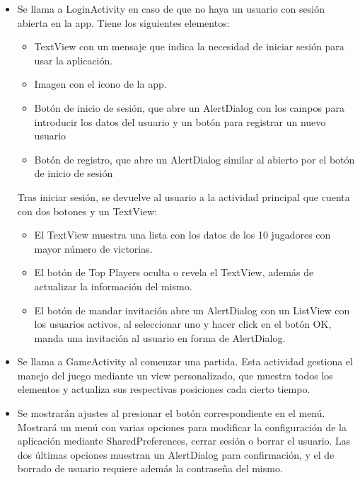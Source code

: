 \documentclass[a4paper,openright,12pt]{article}
\begin{document}
\begin{itemize}
    \item Se llama a LoginActivity en caso de que no haya un usuario con sesión abierta en la app. Tiene los siguientes elementos:
    \begin{itemize}
        \item TextView con un mensaje que indica la necesidad de iniciar sesión para usar la aplicación.
	\item Imagen con el icono de la app.
        \item Botón de inicio de sesión, que abre un AlertDialog con los campos para introducir los datos del usuario y un botón para registrar un nuevo usuario
        \item Botón de registro, que abre un AlertDialog similar al abierto por el botón de inicio de sesión
    \end{itemize}
    Tras iniciar sesión, se devuelve al usuario a la actividad principal que cuenta con dos botones y un TextView:
    \begin{itemize}
       \item El TextView muestra una lista con los datos de los 10 jugadores con mayor número de victorias. 
        
        \item El botón de Top Players oculta o revela el TextView, además de actualizar la información del mismo.
        
        \item El botón de mandar invitación abre un AlertDialog con un ListView con los usuarios activos, al seleccionar uno y hacer click en el botón OK, manda una invitación al usuario en forma de AlertDialog.
    \end{itemize}

    \item Se llama a GameActivity al comenzar una partida. Esta actividad gestiona el manejo del juego mediante un view personalizado, que muestra todos los elementos y actualiza sus respectivas posiciones cada cierto tiempo.

    \item Se mostrarán ajustes al presionar el botón correspondiente en el menú. Mostrará un menú con varias opciones para modificar la configuración de la aplicación mediante SharedPreferences, cerrar sesión o borrar el usuario. Las dos últimas opciones muestran un AlertDialog para confirmación, y el de borrado de usuario requiere además la contraseña del mismo.

\end{itemize}
\end{document}
